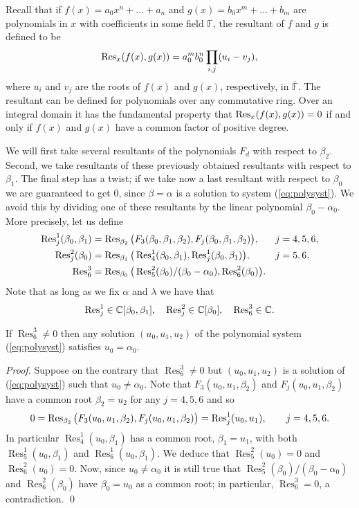Recall that if $f(x)=a_0x^n+\ldots+a_n$ and $g(x)=b_0x^m+\ldots+b_m$ are polynomials in $x$ with coefficients in some field $\mathbb{F}$, the resultant of $f$ and $g$ is defined to be
\[\operatorname{Res}_x(f(x),g(x))=a_0^m b_0^n \prod_{i,j}(u_i-v_j), \]
where $u_i$ and $v_j$ are the roots of $f(x)$ and $g(x)$, respectively, in $\overline{\mathbb{F}}$. The resultant can be defined for polynomials over any commutative ring. Over an integral domain it has the fundamental property that $\operatorname{Res}_x(f(x),g(x))=0$ if and only if $f(x)$ and $g(x)$ have a common factor of positive degree.

We will first take several resultants of the polynomials $F_d$ with respect to $\beta_2$. Second, we take resultants of these previously obtained resultants with respect to $\beta_1$. The final step has a twist; if we take now a last resultant with respect to $\beta_0$ we are guaranteed to get 0, since $\beta=\alpha$ is a solution to system (\ref{eq:polysyst}). We avoid this by dividing one of these resultants by the linear polynomial $\beta_0-\alpha_0$. More precisely, let us define
\begin{align*}
 \operatorname{Res}^1_j(\beta_0,\beta_1) &= \operatorname{Res}_{\beta_2}\big(F_3(\beta_0,\beta_1,\beta_2),F_j(\beta_0,\beta_1,\beta_2)\big), & j &= 4,5,6, \\
 \operatorname{Res}^2_j(\beta_0) &= \operatorname{Res}_{\beta_1}\big(\operatorname{Res}^1_4(\beta_0,\beta_1),\operatorname{Res}^1_j(\beta_0,\beta_1)\big), & j &= 5,6, \\
 \operatorname{Res}^3_6   &= \operatorname{Res}_{\beta_0}\big(\operatorname{Res}^2_5(\beta_0)/(\beta_0-\alpha_0),\operatorname{Res}^2_6(\beta_0)\big). & &
\end{align*}
Note that as long as we fix $\alpha$ and $\lambda$ we have that
\[ \operatorname{Res}^1_j\in\mathbb{C}[\beta_0,\beta_1],\quad \operatorname{Res}_j^2\in\mathbb{C}[\beta_0],\quad \operatorname{Res}^3_6\in\mathbb{C}. \]

\begin{proposition}\label{prop:elimination1}
 If $\operatorname{Res}^3_6\neq0$ then any solution $(u_0,u_1,u_2)$ of the polynomial system \textnormal{(\ref{eq:polysyst})} satisfies $u_0=\alpha_0$.
\end{proposition}

\begin{proof}
 Suppose on the contrary that $\operatorname{Res}^3_6\neq 0$ but $(u_0,u_1,u_2)$ is a solution of (\ref{eq:polysyst}) such that $u_0\neq\alpha_0$. Note that $F_3(u_0,u_1,\beta_2)$ and $F_j(u_0,u_1,\beta_2)$ have a common root $\beta_2=u_2$ for any $j=4,5,6$ and so
\[0=\operatorname{Res}_{\beta_2}\big(F_3(u_0,u_1,\beta_2),F_j(u_0,u_1,\beta_2)\big)=\operatorname{Res}^1_j(u_0,u_1), \qquad j=4,5,6. \]
In particular $\operatorname{Res}^1_4(u_0,\beta_1)$ has a common root, $\beta_1=u_1$, with both $\operatorname{Res}_5^1(u_0,\beta_1)$ and $\operatorname{Res}_6^1(u_0,\beta_1)$. We deduce that $\operatorname{Res}_5^2(u_0)=0$ and $\operatorname{Res}_6^2(u_0)=0$. Now, since $u_0\neq \alpha_0$ it is still true that $\operatorname{Res}_5^2(\beta_0)/(\beta_0-\alpha_0)$ and $\operatorname{Res}_6^2(\beta_0)$ have $\beta_0=u_0$ as a common root; in particular, $\operatorname{Res}^3_6=0$, a contradiction. \qed
\end{proof}


